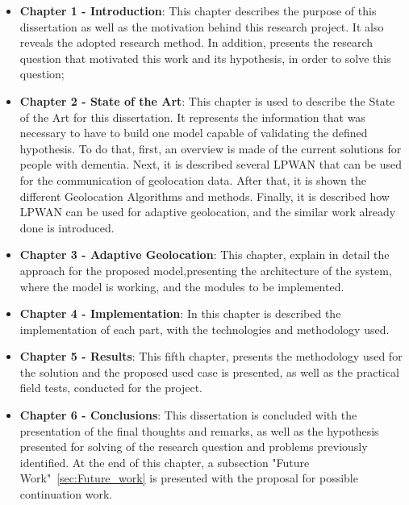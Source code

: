 \begin{itemize}
	\item \textbf{Chapter 1 - Introduction}: This chapter describes the purpose of this dissertation as well as the motivation behind this research project. It also reveals the adopted research method. In addition,  presents the research question that motivated this work and its hypothesis, in order to solve this question;
	
	
	\item \textbf{Chapter 2 - State of the Art}: This chapter is used to describe the State of the Art for this dissertation. It represents the information that was necessary to have to build one model capable of validating the defined hypothesis.
	To do that, first, an overview is made of the current solutions for people with dementia. Next, it is described several LPWAN that can be used for the communication of geolocation data. After that, it is shown the different Geolocation Algorithms and methods. 
	Finally, it is described how LPWAN can be used for adaptive geolocation, and the similar work already done is introduced. 
	
	
	\item \textbf{Chapter 3 - Adaptive Geolocation}: This chapter, explain in detail the approach for the  proposed model,presenting the architecture of the system, where the model is working, and the modules to be implemented. 
	
	
	\item \textbf{Chapter 4 - Implementation}:  In  this chapter is described  the implementation of each part, with the technologies and methodology used.
	
	
	\item \textbf{Chapter 5 - Results}: This fifth chapter, presents the methodology used for the solution and the  proposed used case is presented, as well as the practical field tests, conducted for the project. 
	
	\item \textbf{Chapter 6 - Conclusions}: This dissertation is concluded with the presentation of the final thoughts and remarks, as well as the hypothesis presented for solving of the research question and problems previously identified. At the end of this chapter, a subsection "Future Work"~\ref{sec:Future_work} is presented with the proposal for possible continuation work. 

\end{itemize}



